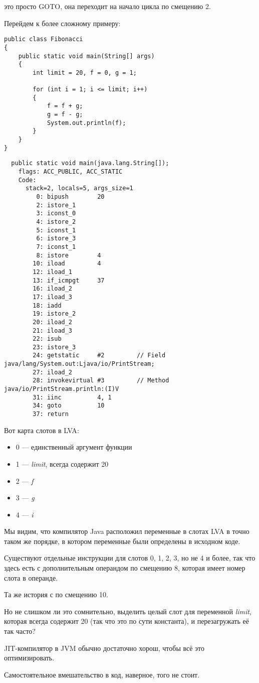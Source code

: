  это просто GOTO, она переходит на начало цикла по смещению 2.


Перейдем к более сложному примеру:

\begin{lstlisting}[style=customjava]
public class Fibonacci
{
	public static void main(String[] args)
	{ 
		int limit = 20, f = 0, g = 1;

		for (int i = 1; i <= limit; i++)
		{
			f = f + g;
			g = f - g;
			System.out.println(f); 
		}
	}
}
\end{lstlisting}

\begin{lstlisting}
  public static void main(java.lang.String[]);
    flags: ACC_PUBLIC, ACC_STATIC
    Code:
      stack=2, locals=5, args_size=1
         0: bipush        20
         2: istore_1      
         3: iconst_0      
         4: istore_2      
         5: iconst_1      
         6: istore_3      
         7: iconst_1      
         8: istore        4
        10: iload         4
        12: iload_1       
        13: if_icmpgt     37
        16: iload_2       
        17: iload_3       
        18: iadd          
        19: istore_2      
        20: iload_2       
        21: iload_3       
        22: isub          
        23: istore_3      
        24: getstatic     #2         // Field java/lang/System.out:Ljava/io/PrintStream;
        27: iload_2       
        28: invokevirtual #3         // Method java/io/PrintStream.println:(I)V
        31: iinc          4, 1
        34: goto          10
        37: return        
\end{lstlisting}
        

Вот карта слотов в \ac{LVA}:

\begin{itemize}
\item 0 --- единственный аргумент функции \main
\item 1 --- \emph{limit}, всегда содержит 20
\item 2 --- \emph{f}
\item 3 --- \emph{g}
\item 4 --- \emph{i}
\end{itemize}


Мы видим, что компилятор Java расположил переменные в слотах \ac{LVA} в точно таком же порядке,
в котором переменные были определены в исходном коде.


Существуют отдельные инструкции  для слотов 0, 1, 2, 3, но не 4 и более, 
так что здесь есть  с дополнительным операндом по смещению 8, 
которая имеет номер слота в операнде.

Та же история с  по смещению 10.


Но не слишком ли это сомнительно, выделить целый слот для переменной \emph{limit},
которая всегда содержит 20 (так что это по сути константа), и перезагружать её так часто?

\ac{JIT}-компилятор в \ac{JVM} обычно достаточно хорош, чтобы всё это оптимизировать.

Самостоятельное вмешательство в код, наверное, того не стоит.

